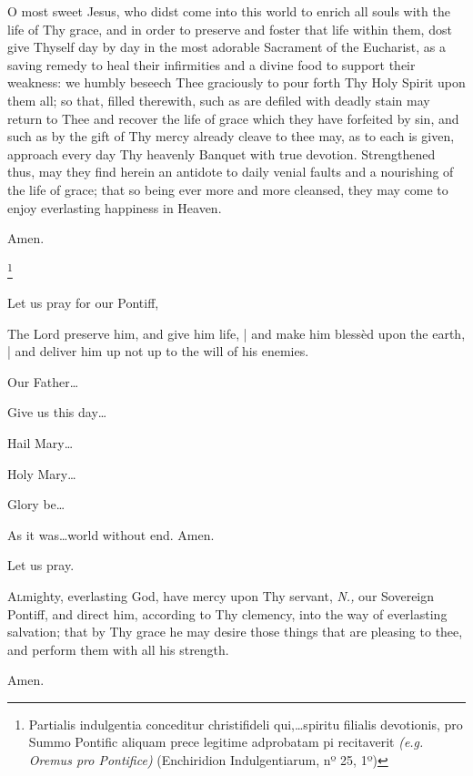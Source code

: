 
\begin{enpars}
\lettrine{O}{} most sweet Jesus, who didst come into this world to enrich all souls with the life of Thy grace, and in order to preserve and foster that life within them, dost give Thyself day by day in the most adorable Sacrament of the Eucharist, as a saving remedy to heal their infirmities and a divine food to support their weakness: we humbly beseech Thee graciously to pour forth Thy Holy Spirit upon them all; so that, filled therewith, such as are defiled with deadly stain may return to Thee and recover the life of grace which they have forfeited by sin, and such as by the gift of Thy mercy already cleave to thee may, as to each is given, approach every day Thy heavenly Banquet with true devotion. Strengthened thus, may they find herein an antidote to daily venial faults and a nourishing of the life of grace; that so being ever more and more cleansed, they may come to enjoy everlasting happiness in Heaven.

\rr Amen.

\footnote{\raggedright{Partialis indulgentia conceditur christifideli qui,…spiritu filialis devotionis, pro Summo Pontific aliquam prece legitime adprobatam pi recitaverit \textit{(e.g. Oremus pro Pontifice)} (Enchiridion Indulgentiarum, nº 25, 1º)}}

\vv Let us pray for our Pontiff, \nomen

\rr The Lord preserve him, and give him life, | and make him blessèd upon the earth, | and deliver him up not up to the will of his enemies.

\vv Our Father…

\rr Give us this day…

\vv Hail Mary…

\rr Holy Mary…

\vv Glory be…

\rr As it was…world without end. Amen.

 Let us pray. \nopagebreak

\lettrine{A}{l}mighty, everlasting God, have mercy upon Thy servant, \textit{N.,} our Sovereign Pontiff, and direct him, according to Thy clemency, into the way of everlasting salvation; that by Thy grace he may desire those things that are pleasing to thee, and perform them with all his strength.

\rr Amen.
\end{enpars}

